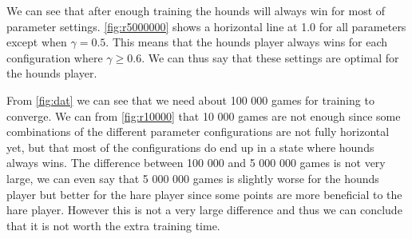 We can see that after enough training the hounds will always win for most of
parameter settings. \autoref{fig:r5000000} shows a horizontal line at 1.0 for
all parameters except when $\gamma = 0.5$. This means that the hounds player
always wins for each configuration where $\gamma \geq 0.6$. We can thus say
that these settings are optimal for the hounds player.

From \autoref{fig:dat} we can see that we need about 100 000 games for training
to converge. We can from \autoref{fig:r10000} that 10 000 games are not enough
since some combinations of the different parameter configurations are not fully
horizontal yet, but that most of the configurations do end up in a state where
hounds always wins. The difference between 100 000 and 5 000 000 games is not
very large, we can even say that 5 000 000 games is slightly worse for the
hounds player but better for the hare player since some points are more
beneficial to the hare player. However this is not a very large difference and
thus we can conclude that it is not worth the extra training time.